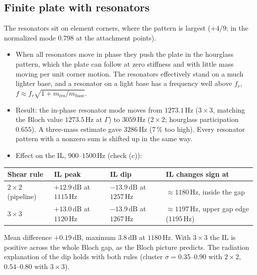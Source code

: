 \subsection{Finite plate with resonators}
The resonators sit on element corners, where the pattern is largest ($+4/9$; in the
normalized mode $0.798$ at the attachment points).
\begin{itemize}
  \item When all resonators move in phase they push the plate in the hourglass pattern,
        which the plate can follow at zero stiffness and with little mass moving per
        unit corner motion. The resonators effectively stand on a much lighter base,
        and a resonator on a light base has a frequency well above $f_r$,
        $f \approx f_r\sqrt{1 + m_\mathrm{res}/m_\mathrm{base}}$.
  \item Result: the in-phase resonator mode moves from $1273.1\,\mathrm{Hz}$ ($3\times 3$,
        matching the Bloch value $1273.5\,\mathrm{Hz}$ at $\Gamma$) to
        $3059\,\mathrm{Hz}$ ($2\times 2$; hourglass participation $0.655$). A
        three-mass estimate gave $3286\,\mathrm{Hz}$ ($7\,\%$ too high). Every
        resonator pattern with a nonzero sum is shifted up in the same way.
  \item Effect on the IL, $900$--$1500\,\mathrm{Hz}$ (check (c)):
\end{itemize}
\begin{center}
\begin{tabular}{|l|l|l|l|}
\hline
Shear rule & IL peak & IL dip & IL changes sign at \\
\hline
$2\times 2$ (pipeline) & $+12.9\,\mathrm{dB}$ at $1115\,\mathrm{Hz}$ & $-13.9\,\mathrm{dB}$ at $1257\,\mathrm{Hz}$ & $\approx 1180\,\mathrm{Hz}$, inside the gap \\
$3\times 3$ & $+13.0\,\mathrm{dB}$ at $1120\,\mathrm{Hz}$ & $-13.9\,\mathrm{dB}$ at $1267\,\mathrm{Hz}$ & $\approx 1197\,\mathrm{Hz}$, upper gap edge ($1195\,\mathrm{Hz}$) \\
\hline
\end{tabular}
\end{center}
Mean difference $+0.19\,\mathrm{dB}$, maximum $3.8\,\mathrm{dB}$ at $1180\,\mathrm{Hz}$.
With $3\times 3$ the IL is positive across the whole Bloch gap, as the Bloch picture
predicts. The radiation explanation of the dip holds with both rules (cluster
$\sigma = 0.35$--$0.90$ with $2\times 2$, $0.54$--$0.80$ with $3\times 3$).

